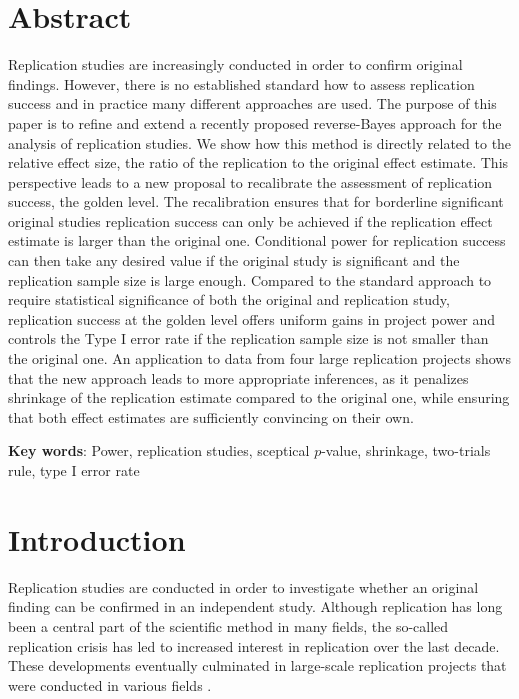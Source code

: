 \section*{Abstract}
Replication studies are increasingly conducted in order to confirm original
findings. However, there is no established standard how to assess replication
success and in practice many different approaches are used. The purpose of this
paper is to refine and extend a recently proposed reverse-Bayes approach for the
analysis of replication studies. We show how this method is directly related to
the relative effect size, the ratio of the replication to the original effect
estimate. This perspective leads to a new proposal to recalibrate the assessment
of replication success, the golden level. The recalibration ensures that for
borderline significant original studies replication success can only be achieved
if the replication effect estimate is larger than the original one. Conditional
power for replication success can then take any desired value if the original
study is significant and the replication sample size is large enough. Compared
to the standard approach to require statistical significance of both the
original and replication study, replication success at the golden level offers
uniform gains in project power and controls the Type I error rate if the
replication sample size is not smaller than the original one. An application to
data from four large replication projects shows that the new approach leads to
more appropriate inferences, as it penalizes shrinkage of the replication
estimate compared to the original one, while ensuring that both effect estimates
are sufficiently convincing on their own.

\textbf{Key words}: Power, replication studies, sceptical $p$-value, shrinkage,
two-trials rule, type I error rate

\section{Introduction}
Replication studies are conducted in order to investigate whether an original
finding can be confirmed in an independent study. Although replication has long
been a central part of the scientific method in many fields, the so-called
replication crisis \citep{Ioannidis2005, Begley2015} has led to increased
interest in replication over the last decade. These developments eventually
culminated in large-scale replication projects that were conducted in various
fields \citep{Errington2014, Klein2014, Opensc2015, Ebersole2016, Camerer2016,
  Camerer2018, Cova2018, Klein2018}.

